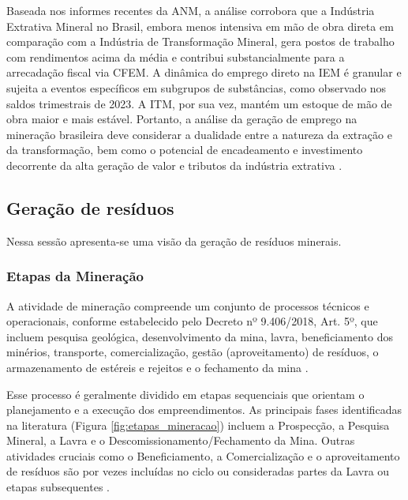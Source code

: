 Baseada nos informes recentes da ANM, a análise corrobora que a Indústria Extrativa Mineral no Brasil, embora menos intensiva em mão de obra direta em comparação com a Indústria de Transformação Mineral, gera postos de trabalho com rendimentos acima da média e contribui substancialmente para a arrecadação fiscal via CFEM. A dinâmica do emprego direto na IEM é granular e sujeita a eventos específicos em subgrupos de substâncias, como observado nos saldos trimestrais de 2023. A ITM, por sua vez, mantém um estoque de mão de obra maior e mais estável. Portanto, a análise da geração de emprego na mineração brasileira deve considerar a dualidade entre a natureza da extração e da transformação, bem como o potencial de encadeamento e investimento decorrente da alta geração de valor e tributos da indústria extrativa \cite{anm2023c,anm2023d}.

\subsection{Geração de resíduos}
\label{subsec:geracao_residuos}

Nessa sessão apresenta-se uma visão da geração de resíduos minerais.

\subsubsection{Etapas da Mineração}
\label{subsubsec:etapas_da_mineracao}

A atividade de mineração compreende um conjunto de processos técnicos e operacionais, conforme estabelecido pelo Decreto nº 9.406/2018, Art. 5º, que incluem pesquisa geológica, desenvolvimento da mina, lavra, beneficiamento dos minérios, transporte, comercialização, gestão (aproveitamento) de resíduos, o armazenamento de estéreis e rejeitos e o fechamento da mina \cite{brasil2018}.

Esse processo é geralmente dividido em etapas sequenciais que orientam o planejamento e a execução dos empreendimentos. As principais fases identificadas na literatura (Figura \ref{fig:etapas_mineracao}) incluem a Prospecção, a Pesquisa Mineral, a Lavra e o Descomissionamento/Fechamento da Mina. Outras atividades cruciais como o Beneficiamento, a Comercialização e o aproveitamento de resíduos são por vezes incluídas no ciclo ou consideradas partes da Lavra ou etapas subsequentes \cite{carvalho2018, freire2020}.

